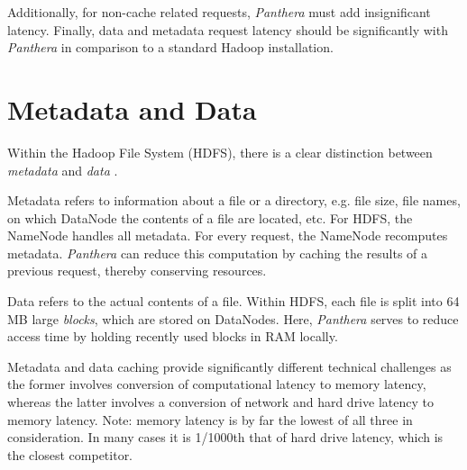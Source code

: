 \documentclass[12pt]{article}
\begin{document}
Additionally, for non-cache related requests, \textit{Panthera} must add insignificant latency. Finally, data and metadata request latency should be significantly with \textit{Panthera} in comparison to a standard Hadoop installation.

\section{Metadata and Data}

Within the Hadoop File System (HDFS), there is a clear distinction between \textit{metadata} and \textit{data} \cite{hdfs}. 

Metadata refers to information about a file or a directory, e.g. file size, file names, on which DataNode the contents of a file are located, etc. For HDFS, the NameNode handles all metadata. For every request, the NameNode recomputes metadata. \textit{Panthera} can reduce this computation by caching the results of a previous request, thereby conserving resources.

Data refers to the actual contents of a file. Within HDFS, each file is split into 64 MB large \textit{blocks}, which are stored on DataNodes. Here, \textit{Panthera} serves to reduce access time by holding recently used blocks in RAM locally.

Metadata and data caching provide significantly different technical challenges as the former involves conversion of computational latency to memory latency, whereas the latter involves a conversion of network and hard drive latency to memory latency. Note: memory latency is by far the lowest of all three in consideration. In many cases \cite{ramcloud} it is 1/1000th that of hard drive latency, which is the closest competitor.
\end{document}
